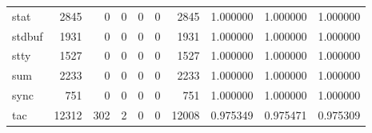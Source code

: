 \begin{longtable}{lrrrrrrrrr}
stat      &                                               2845 &                                                  0 &                                                  0 &                                                  0 &                                                  0 &                                               2845 &                                           1.000000 &                               1.000000 &                             1.000000 \\
stdbuf    &                                               1931 &                                                  0 &                                                  0 &                                                  0 &                                                  0 &                                               1931 &                                           1.000000 &                               1.000000 &                             1.000000 \\
stty      &                                               1527 &                                                  0 &                                                  0 &                                                  0 &                                                  0 &                                               1527 &                                           1.000000 &                               1.000000 &                             1.000000 \\
sum       &                                               2233 &                                                  0 &                                                  0 &                                                  0 &                                                  0 &                                               2233 &                                           1.000000 &                               1.000000 &                             1.000000 \\
sync      &                                                751 &                                                  0 &                                                  0 &                                                  0 &                                                  0 &                                                751 &                                           1.000000 &                               1.000000 &                             1.000000 \\
tac       &                                              12312 &                                                302 &                                                  2 &                                                  0 &                                                  0 &                                              12008 &                                           0.975349 &                               0.975471 &                             0.975309 \\

\end{longtable}
